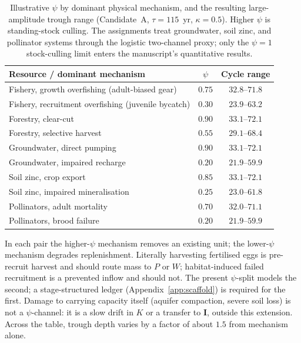 \documentclass[11pt]{article}
\theoremstyle{definition}
\begin{document}
\begin{table}[t]
\centering\small
\caption{Illustrative $\psi$ by dominant physical mechanism, and the resulting large-amplitude trough range (Candidate~A, $\tau=115$~yr, $\kappa=0.5$). Higher $\psi$ is standing-stock culling. The assignments treat groundwater, soil zinc, and pollinator systems through the logistic two-channel proxy; only the $\psi=1$ stock-culling limit enters the manuscript's quantitative results.}
\label{tab:psi-assignment}
\begin{tabular}{lcc}
\toprule
Resource / dominant mechanism & $\psi$ & Cycle range \\
\midrule
Fishery, growth overfishing (adult-biased gear) & $0.75$ & $32.8$--$71.8$ \\
Fishery, recruitment overfishing (juvenile bycatch) & $0.30$ & $23.9$--$63.2$ \\
Forestry, clear-cut & $0.90$ & $33.1$--$72.1$ \\
Forestry, selective harvest & $0.55$ & $29.1$--$68.4$ \\
Groundwater, direct pumping & $0.90$ & $33.1$--$72.1$ \\
Groundwater, impaired recharge & $0.20$ & $21.9$--$59.9$ \\
Soil zinc, crop export & $0.85$ & $33.1$--$72.1$ \\
Soil zinc, impaired mineralisation & $0.25$ & $23.0$--$61.8$ \\
Pollinators, adult mortality & $0.70$ & $32.0$--$71.1$ \\
Pollinators, brood failure & $0.20$ & $21.9$--$59.9$ \\
\bottomrule
\end{tabular}
\end{table}

In each pair the higher-$\psi$ mechanism removes an existing unit; the lower-$\psi$ mechanism degrades replenishment. Literally harvesting fertilised eggs is pre-recruit harvest and should route mass to $P$ or $W$; habitat-induced failed recruitment is a prevented inflow and should not. The present $\psi$-split models the second; a stage-structured ledger (Appendix~\ref{app:scaffold}) is required for the first. Damage to carrying capacity itself (aquifer compaction, severe soil loss) is not a $\psi$-channel: it is a slow drift in $K$ or a transfer to $\mathbf I$, outside this extension. Across the table, trough depth varies by a factor of about $1.5$ from mechanism alone.
\end{document}
